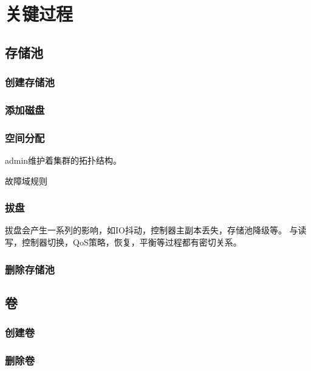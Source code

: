 \chapter{关键过程}

\section{存储池}

\subsection{创建存储池}

\subsection{添加磁盘}


\subsection{空间分配}

admin维护着集群的拓扑结构。

故障域规则

\subsection{拔盘}

拔盘会产生一系列的影响，如IO抖动，控制器主副本丢失，存储池降级等。
与读写，控制器切换，QoS策略，恢复，平衡等过程都有密切关系。

\subsection{删除存储池}

\section{卷}

\subsection{创建卷}
\subsection{删除卷}
